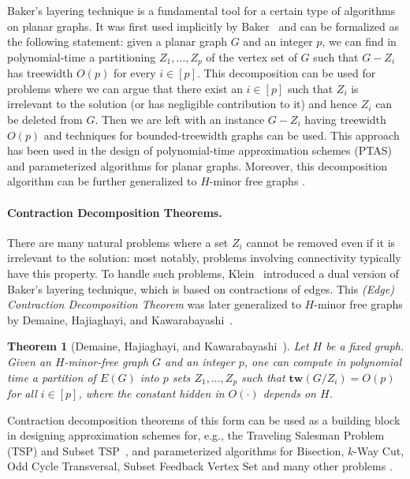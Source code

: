 \documentclass[a4paper,11pt]{article}
\numberwithin{lemma}{section}
\newtheorem{theorem}[lemma]{Theorem}
\newcommand{\tw}{\mathbf{tw}}
\begin{document}
Baker's layering technique is a fundamental tool for a certain type of algorithms on planar graphs.
It was first used implicitly by Baker~\cite{Baker94} and can be formalized as the following statement: given a planar graph $G$ and an integer $p$, we can find in polynomial-time a partitioning $Z_1,\dots,Z_p$ of the vertex set of $G$ such that $G-Z_i$ has treewidth $O(p)$ for every $i \in [p]$.
This decomposition can be used for problems where we can argue that there exist an $i \in [p]$ such that $Z_i$ is irrelevant to the solution (or has negligible contribution to it) and hence $Z_i$ can be deleted from $G$.
Then we are left with an instance $G-Z_i$ having treewidth $O(p)$ and techniques for bounded-treewidth graphs can be used.
This approach has been used in the design of polynomial-time approximation schemes (PTAS) \cite{Baker94,DemaineHK05,KhannaM96} and parameterized algorithms \cite{BuiP92,DornFLRS13,Eppstein99,FominLMPPS16,Grohe03,Tazari12} for planar graphs.
Moreover, this decomposition algorithm can be further generalized to $H$-minor free graphs \cite{DemaineHK05}.

\paragraph{Contraction Decomposition Theorems.}
There are many natural problems where a set $Z_i$ cannot be removed even if it is irrelevant to the solution: most notably, problems involving connectivity typically have this property.
To handle such problems, Klein~\cite{Klein08} introduced a dual version of Baker's layering technique, which is based on contractions of edges.
This \emph{(Edge) Contraction Decomposition Theorem} was later generalized to $H$-minor free graphs by Demaine, Hajiaghayi, and Kawarabayashi~\cite{DemaineHK11}.

\begin{theorem}[Demaine, Hajiaghayi, and Kawarabayashi~\cite{DemaineHK11}]
 \label{thm-edge-contraction}
 Let $H$ be a fixed graph.
 Given an $H$-minor-free graph $G$ and an integer $p$, one can compute in polynomial time a partition of $E(G)$ into $p$ sets $Z_1,\dots,Z_p$ such that $\tw(G/Z_i) = O(p)$ for all $i \in [p]$, where the constant hidden in $O(\cdot)$ depends on $H$.
\end{theorem}

Contraction decomposition theorems of this form can be used as a building block in designing approximation schemes for, e.g., the {\sc Traveling Salesman Problem (TSP)} and {\sc Subset TSP}~\cite{BuiP92,DemaineHK11,DemaineHM10,Klein06,Klein08}, and parameterized algorithms for {\sc Bisection}, {\sc $k$-Way Cut}, {\sc Odd Cycle Transversal}, {\sc Subset Feedback Vertex Set} and many other problems \cite{BandyapadhyayLLSX24,KawarabayashiT11,MarxMNT22}.
\end{document}
